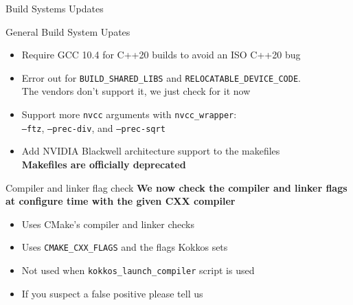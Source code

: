 
\begin{frame}[fragile]

  {\Huge Build Systems Updates}

  \vspace{10pt}

\end{frame}


\begin{frame}[fragile]{General Build System Upates}
    \begin{itemize}
        \item Require GCC 10.4 for C++20 builds to avoid an ISO C++20 bug %
        \item Error out for  \texttt{BUILD\_SHARED\_LIBS} and \texttt{RELOCATABLE\_DEVICE\_CODE}. \\  The vendors don't support it, we just check for it now %
        \item Support more \texttt{nvcc} arguments with \texttt{nvcc\_wrapper}: \\ \texttt{--ftz}, \texttt{--prec-div}, and \texttt{--prec-sqrt} %
        \item Add NVIDIA Blackwell architecture support to the makefiles \\  \textbf{Makefiles are officially deprecated} %

    \end{itemize}
\end{frame}

\begin{frame}[fragile]{Compiler and linker flag check}
  \centering
  \textbf{We now check the compiler and linker flags at configure time with the given CXX compiler} %
    \begin{itemize}
        \item Uses CMake's compiler and linker checks
        \item Uses \texttt{CMAKE\_CXX\_FLAGS} and the flags Kokkos sets
        \item Not used when \texttt{kokkos\_launch\_compiler} script is used
        \item If you suspect a false positive please tell us
    \end{itemize}
\end{frame}

